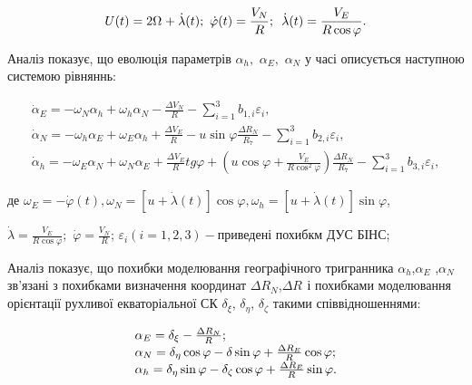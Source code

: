 \[U(t)=2\Omega _{{\rm }} +\dot{\lambda }(t);\, \, \dot{\varphi }(t)=\frac{V_{N} }{R} 
;\, \, \, \dot{\lambda }(t)=\frac{V_{E} }{R\cos \varphi } .\] 

  Аналіз показує, що еволюція параметрів $\alpha _{h} ,\, \, \alpha _{E} ,\, \, \alpha 
_{N} $ у часі описується наступною системою рівняннь:



\begin{equation} \label{eq:__6_6_} \begin{array}{l} {\dot{\alpha }_{E} =-\omega 
_{N} \alpha _{h} +\omega _{h} \alpha _{N} -\frac{\Delta V_{N} }{R} -\sum _{i=1}^{3}b_{1,i}  
\varepsilon _{i} ,} \\ {\dot{\alpha }_{N} =-\omega _{h} \alpha _{E} +\omega _{E} 
\alpha _{h} +\frac{\Delta V_{E} }{R} -u\sin \varphi \frac{\Delta R_{N} }{R_{7} } 
-\sum _{i=1}^{3}b_{2,i}  \varepsilon _{i} ,} \\ {\dot{\alpha }_{h} =-\omega _{E} 
\alpha _{N} +\omega _{N} \alpha _{E} +\frac{\Delta V_{E} }{R} tg\varphi +(u\cos \varphi 
+\frac{V_{E} }{R\cos ^{2} \varphi } )\frac{\Delta R_{N} }{R_{7} } -\sum _{i=1}^{3}b_{3,i}  
\varepsilon _{i} ,} \end{array} \end{equation} 

де  $\omega _{E} =-\dot{\varphi }(t),\omega _{N} =\left[u+\dot{\lambda }(t)\right]
\cos \varphi ,\omega _{h} =\left[u+\dot{\lambda }(t)\right]\sin \varphi ,$

$\dot{\lambda }=\frac{V_{E} }{R\cos \varphi } ;$ $\dot{\varphi }=\frac{V_{N} }{R} $; $\varepsilon 
_{i} (i=1,2,3)-$приведені похибкм ДУС БІНС;

Аналіз показує, що похибки моделювання географічного тригранника $\alpha _{h} $,$\alpha 
_{E} $ ,$\alpha _{N} $ зв'язані з похибками визначення координат $\Delta R_{N} $,$\Delta 
R_{} $ і похибками моделювання орієнтації рухливої екваторіальної СК $\delta _{\xi 
} $, $\delta _{\eta } $, $\delta _{\zeta } $ такими   співвідношеннями:

\[\begin{array}{l} {\alpha _{E} =\delta _{\xi } -\frac{\Delta R_{N} }{R_{{\rm }} 
} ;} \\ {\alpha _{N} =\delta _{\eta } \cos \varphi -\delta \sin \varphi +\frac{\Delta 
R_{E} }{R_{{\rm }} } \cos \varphi ;} \\ {\alpha _{h} =\delta _{\eta } \sin \varphi 
-\delta _{\zeta } \cos \varphi +\frac{\Delta R_{E} }{R_{{\rm }} } \sin \varphi .} 
\end{array}\] 

